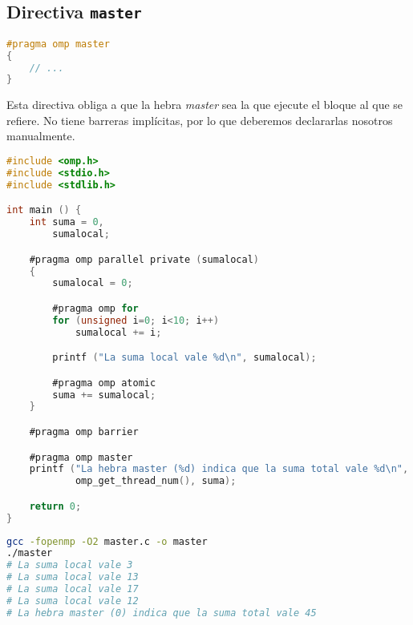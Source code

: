 \subsection{Directiva \texttt{master}}\label{directivas-openmp-directivas}

\begin{lstlisting}[language=C]
#pragma omp master
{
	// ...
}
\end{lstlisting}

Esta directiva obliga a que la hebra \textit{master} sea la que ejecute el bloque al que se refiere.
No tiene barreras implícitas, por lo que deberemos declararlas nosotros manualmente.

\begin{lstlisting}[language=C]
#include <omp.h>
#include <stdio.h>
#include <stdlib.h>

int main () {
	int suma = 0,
	    sumalocal;

	#pragma omp parallel private (sumalocal)
	{
		sumalocal = 0;

		#pragma omp for
		for (unsigned i=0; i<10; i++)
			sumalocal += i;

		printf ("La suma local vale %d\n", sumalocal);

		#pragma omp atomic
		suma += sumalocal;
	}

	#pragma omp barrier

	#pragma omp master
	printf ("La hebra master (%d) indica que la suma total vale %d\n",
	        omp_get_thread_num(), suma);

	return 0;
}
\end{lstlisting}

\begin{lstlisting}[language=sh]
gcc -fopenmp -O2 master.c -o master
./master
# La suma local vale 3
# La suma local vale 13
# La suma local vale 17
# La suma local vale 12
# La hebra master (0) indica que la suma total vale 45
\end{lstlisting}
